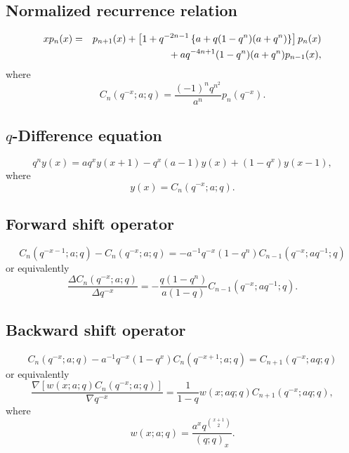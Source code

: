 \documentclass[envcountchap,graybox]{svmono}
\newcommand{\mathindent}{\hspace{7.5mm}}
\begin{document}
\subsection*{Normalized recurrence relation}
\begin{eqnarray}
\label{NormRecqCharlier}
xp_n(x)&=&p_{n+1}(x)+\left[1+q^{-2n-1}\left\{a+q(1-q^n)(a+q^n)\right\}\right]p_n(x)\nonumber\\
& &{}\mathindent{}+aq^{-4n+1}(1-q^n)(a+q^n)p_{n-1}(x),
\end{eqnarray}
where
$$C_n(q^{-x};a;q)=\frac{(-1)^nq^{n^2}}{a^n}p_n(q^{-x}).$$

\subsection*{$q$-Difference equation}
\begin{equation}
\label{dvqCharlier}
q^ny(x)=aq^xy(x+1)-q^x(a-1)y(x)+(1-q^x)y(x-1),
\end{equation}
where
$$y(x)=C_n(q^{-x};a;q).$$

\subsection*{Forward shift operator}
\begin{equation}
\label{shift1qCharlierI}
C_n(q^{-x-1};a;q)-C_n(q^{-x};a;q)=-a^{-1}q^{-x}(1-q^n)C_{n-1}(q^{-x};aq^{-1};q)
\end{equation}
or equivalently
\begin{equation}
\label{shift1qCharlierII}
\frac{\Delta C_n(q^{-x};a;q)}{\Delta q^{-x}}=-\frac{q(1-q^n)}{a(1-q)}C_{n-1}(q^{-x};aq^{-1};q).
\end{equation}

\newpage

\subsection*{Backward shift operator}
\begin{equation}
\label{shift2qCharlierI}
C_n(q^{-x};a;q)-a^{-1}q^{-x}(1-q^x)C_n(q^{-x+1};a;q)=C_{n+1}(q^{-x};aq;q)
\end{equation}
or equivalently
\begin{equation}
\label{shift2qCharlierII}
\frac{\nabla\left[w(x;a;q)C_n(q^{-x};a;q)\right]}{\nabla q^{-x}}
=\frac{1}{1-q}w(x;aq;q)C_{n+1}(q^{-x};aq;q),
\end{equation}
where
$$w(x;a;q)=\frac{a^xq^{\binom{x+1}{2}}}{(q;q)_x}.$$
\end{document}
